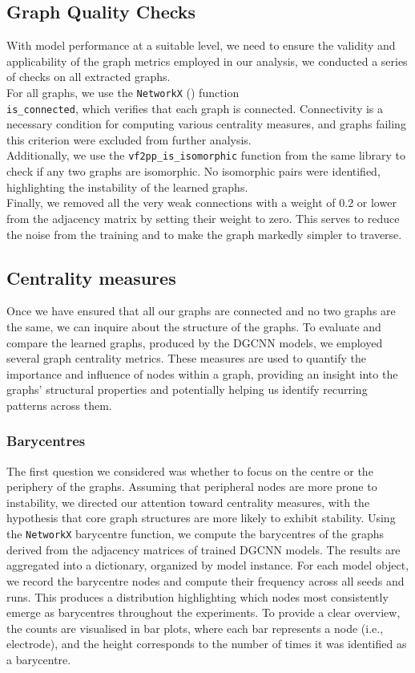 \subsection{Graph Quality Checks}
With model performance at a suitable level, we need to ensure the validity and applicability of the graph metrics employed in our analysis, we conducted a series of checks on all extracted graphs. 
\vspace{0.5em}\\
For all graphs, we use the \texttt{NetworkX} (\cite{NetworkX}) function \\
\texttt{is\_connected}, which verifies that each graph is connected. Connectivity is a necessary condition for computing various centrality measures, and graphs failing this criterion were excluded from further analysis.
\vspace{0.5em}\\
Additionally, we use the \texttt{vf2pp\_is\_isomorphic} function from the same library to check if any two graphs are isomorphic. No isomorphic pairs were identified, highlighting the instability of the learned graphs.
\vspace{0.5em}\\
Finally, we removed all the very weak connections with a weight of 0.2 or lower from the adjacency matrix by setting their weight to zero. This serves to reduce the noise from the training and to make the graph markedly simpler to traverse. 

\subsection{Centrality measures}
Once we have ensured that all our graphs are connected and no two graphs are the same, we can inquire about the structure of the graphs. To evaluate and compare the learned graphs, produced by the DGCNN models, we employed several graph centrality metrics. These measures are used to quantify the importance and influence of nodes within a graph, providing an insight into the graphs’ structural properties and potentially helping us identify recurring patterns across them.
\subsubsection{Barycentres}
The first question we considered was whether to focus on the centre or the periphery of the graphs. Assuming that peripheral nodes are more prone to instability, we directed our attention toward centrality measures, with the hypothesis that core graph structures are more likely to exhibit stability. Using the \texttt{NetworkX} barycentre function, we compute the barycentres of the graphs derived from the adjacency matrices of trained DGCNN models. The results are aggregated into a dictionary, organized by model instance. For each model object, we record the barycentre nodes and compute their frequency across all seeds and runs. This produces a distribution highlighting which nodes most consistently emerge as barycentres throughout the experiments.
To provide a clear overview, the counts are visualised in bar plots, where each bar represents a node (i.e., electrode), and the height corresponds to the number of times it was identified as a barycentre. 
